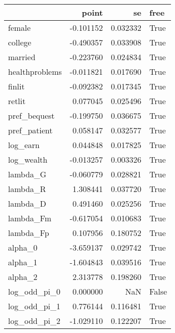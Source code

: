 \begin{tabular}{lrrl}
\toprule
{} &     point &        se &   free \\
\midrule
female         & -0.101152 &  0.032332 &   True \\
college        & -0.490357 &  0.033908 &   True \\
married        & -0.223760 &  0.024834 &   True \\
healthproblems & -0.011821 &  0.017690 &   True \\
finlit         & -0.092382 &  0.017345 &   True \\
retlit         &  0.077045 &  0.025496 &   True \\
pref\_bequest   & -0.199750 &  0.036675 &   True \\
pref\_patient   &  0.058147 &  0.032577 &   True \\
log\_earn       &  0.044848 &  0.017825 &   True \\
log\_wealth     & -0.013257 &  0.003326 &   True \\
lambda\_G       & -0.060779 &  0.028821 &   True \\
lambda\_R       &  1.308441 &  0.037720 &   True \\
lambda\_D       &  0.491460 &  0.025256 &   True \\
lambda\_Fm      & -0.617054 &  0.010683 &   True \\
lambda\_Fp      &  0.107956 &  0.180752 &   True \\
alpha\_0        & -3.659137 &  0.029742 &   True \\
alpha\_1        & -1.604843 &  0.039516 &   True \\
alpha\_2        &  2.313778 &  0.198260 &   True \\
log\_odd\_pi\_0   &  0.000000 &       NaN &  False \\
log\_odd\_pi\_1   &  0.776144 &  0.116481 &   True \\
log\_odd\_pi\_2   & -1.029110 &  0.122207 &   True \\
\bottomrule
\end{tabular}

